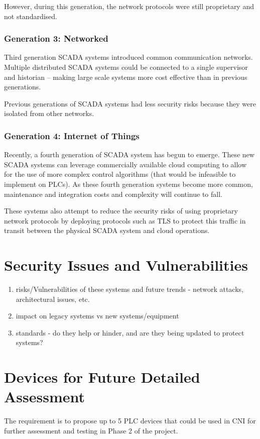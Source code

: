 However, during this generation, the network protocols were still proprietary and not standardised.
\subsubsection*{Generation 3: Networked}
Third generation SCADA systems introduced common communication networks. Multiple distributed SCADA systems could be connected to a single supervisor and historian -- making large scale systems more cost effective than in previous generations.

Previous generations of SCADA systems had less security risks because they were isolated from other networks.
\subsubsection*{Generation 4: Internet of Things}
Recently, a fourth generation of SCADA system has begun to emerge. These new SCADA systems can leverage commercially available cloud computing to allow for the use of more complex control algorithms (that would be infeasible to implement on PLCs). As these fourth generation systems become more common, maintenance and integration costs and complexity will continue to fall.

These systems also attempt to reduce the security risks of using proprietary network protocols by deploying protocols such as TLS to protect this traffic in transit between the physical SCADA system and cloud operations.

\pagebreak
\section{Security Issues and Vulnerabilities}
\begin{todoenv}
  \begin{enumerate}[label=(\alph*)]
    \item risks/Vulnerabilities of these systems and future trends - network attacks, architectural issues, etc.
    \item impact on legacy systems vs new systems/equipment
    \item standards - do they help or hinder, and are they being updated to protect systems?
  \end{enumerate}
\end{todoenv}

\pagebreak
\section{Devices for Future Detailed Assessment}
The requirement is to propose up to 5 PLC devices that could be used in CNI for further assessment and testing in Phase 2 of the project.

